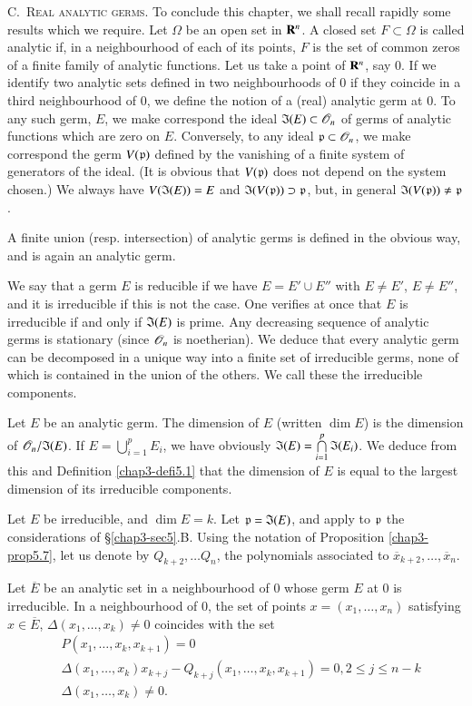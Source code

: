 \noindent
C.~\textsc{Real analytic germs.} To conclude this chapter, we shall recall rapidly some results which we require. Let $\Omega$ be an open set in $\mathbf{R}^{n}$. A closed set $F\subset \Omega$ is called analytic if, in a neighbourhood of each of its points, $F$ is the set of common zeros of a finite family of analytic functions. Let us take a point of $\mathbf{R}^{n}$, say $0$. If we identify two analytic sets defined in two neighbourhoods of $0$ if they coincide in a third neighbourhood of $0$, we define the notion of a (real) analytic germ at $0$. To any such germ, $E$, we make correspond the ideal $\mathfrak{I}(E)\subset \mathscr{O}_{n}$ of germs of analytic functions which are zero on $E$. Conversely, to any ideal $\mathfrak{p}\subset \mathscr{O}_{n}$, we make correspond the germ $V(\mathfrak{p})$ defined by the vanishing of a finite system of generators of the ideal. (It is obvious that $V(\mathfrak{p})$ does not depend on the system chosen.) We always have $V(\mathfrak{I}(E))=E$ and $\mathfrak{I}(V(\mathfrak{p}))\supset \mathfrak{p}$, but, in general $\mathfrak{I}(V(\mathfrak{p}))\neq \mathfrak{p}$.

A finite union (resp. intersection) of analytic germs is defined in the obvious way, and is again an analytic germ.

We say that a germ $E$ is reducible if we have $E=E'\cup E''$ with $E\neq E'$, $E\neq E''$, and it is irreducible if this is not the case. One verifies at once that $E$ is irreducible if and only if $\mathfrak{I}(E)$ is prime. Any decreasing sequence of analytic germs is stationary (since $\mathscr{O}_{n}$ is noetherian). We deduce that every analytic germ can be decomposed in a unique way into a finite set of irreducible germs, none of which is contained in the union of the others. We call these the irreducible components.

Let $E$ be an analytic germ. The dimension of $E$ (written $\dim E$) is the dimension of $\mathscr{O}_{n}/\mathfrak{I}(E)$. If $E=\bigcup\limits^{p}_{i=1}E_{i}$, we have obviously $\mathfrak{I}(E)=\bigcap\limits^{p}_{i=1}\mathfrak{I}(E_{i})$. We deduce from this and Definition \ref{chap3-defi5.1} that the dimension of $E$ is equal to the largest dimension of its irreducible components.

Let $E$ be irreducible, and $\dim E=k$. Let $\mathfrak{p}=\mathfrak{I}(E)$, and apply to $\mathfrak{p}$ the considerations of \S\ref{chap3-sec5}.B. Using the notation of Proposition \ref{chap3-prop5.7}, let us denote by $Q_{k+2},\ldots Q_{n}$, the polynomials associated to $\overline{x}_{k+2},\ldots,\overline{x}_{n}$.

\begin{proposition}\label{chap3-prop5.8}
Let $\overline{E}$ be an analytic set in a neighbourhood of $0$ whose germ $E$ at $0$ is irreducible. In a neighbourhood of $0$, the set of points $x=(x_{1},\ldots,x_{n})$ satisfying $x\in \overline{E}$, $\Delta(x_{1},\ldots,x_{k})\neq 0$ coincides with the set
\begin{align*}
& P(x_{1},\ldots,x_{k},x_{k+1})=0\\
& \Delta(x_{1},\ldots,x_{k})x_{k+j}-Q_{k+j}(x_{1},\ldots,x_{k},x_{k+1})=0, 2\leq j\leq n-k\\
& \Delta (x_{1},\ldots,x_{k})\neq 0.
\end{align*}
\end{proposition}

